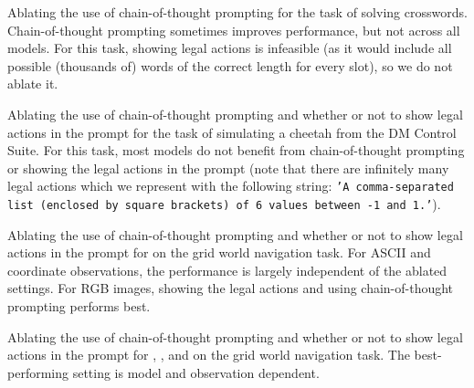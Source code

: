\begin{table}
    \caption{
        Ablating the use of chain-of-thought prompting for the task of solving crosswords.
        Chain-of-thought prompting sometimes improves performance, but not across all models.
        For this task, showing legal actions is infeasible (as it would include all possible (\ie thousands of) words of the correct length for every slot), so we do not ablate it.
    }
    \begin{center}
        \resizebox{0.55\textwidth}{!}{}
    \end{center}
    \label{tab:crossword-ablation}
\end{table}

\begin{table}
    \caption{
        Ablating the use of chain-of-thought prompting and whether or not to show legal actions in the prompt for the task of simulating a cheetah from the DM Control Suite.
        For this task, most models do not benefit from chain-of-thought prompting or showing the legal actions in the prompt (note that there are infinitely many legal actions which we represent with the following string: \texttt{'A comma-separated list (enclosed by square brackets) of 6 values between -1 and 1.'}).
    }
    \begin{center}
        \resizebox{0.55\textwidth}{!}{}
    \end{center}
    \label{tab:dm-control-ablation}
\end{table}

\begin{table}
    \caption{
        Ablating the use of chain-of-thought prompting and whether or not to show legal actions in the prompt for \claude{} on the grid world navigation task.
        For ASCII and coordinate observations, the performance is largely independent of the ablated settings.
        For RGB images, showing the legal actions and using chain-of-thought prompting performs best.
    }
    \begin{center}
        \resizebox{0.55\textwidth}{!}{}
    \end{center}
    \label{tab:grid-world-ablation-anthropic}
\end{table}

\begin{table}
    \caption{
        Ablating the use of chain-of-thought prompting and whether or not to show legal actions in the prompt for \flash{}, \pro{}, and \expflash{} on the grid world navigation task.
        The best-performing setting is model and observation dependent.
    }
    \begin{center}
        \resizebox{0.55\textwidth}{!}{}
    \end{center}
    \label{tab:grid-world-ablation-gemini}
\end{table}

